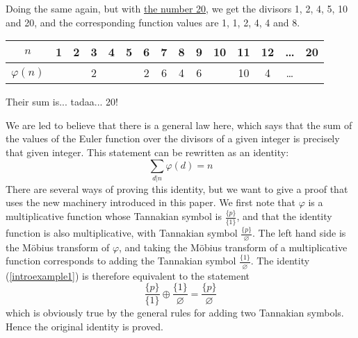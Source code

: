 \documentclass[a4paper]{article}
\begin{document}
\begin{example}
Doing the same again, but with \underline{the number 20}, we get the divisors 1, 2, 4, 5, 10 and 20, and the corresponding function values are 1, 1, 2, 4, 4 and 8. 

\vspace{6pt}
\begin{tabular}{  | c || c | c | c | c | c | c | c | c | c | c | c | c | c | c |  }
  \hline			
  $n$ & \bf{1} & \bf{2} & 3 & \bf{4} & \bf{5} & 6 & 7 & 8 & 9 & \bf{10} & 11 & 12 & \ldots & \bf{20}  \\
  \hline
  $\varphi(n) $ & \raisebox{.5pt}{\textcircled{\raisebox{-.9pt} {1}}} & \raisebox{.5pt}{\textcircled{\raisebox{-.9pt} {1}}} & 2 &  \raisebox{.5pt}{\textcircled{\raisebox{-.9pt} {2}}} &  \raisebox{.5pt}{\textcircled{\raisebox{-.9pt} {4}}} & 2 & 6 & 4 & 6 &  \raisebox{.5pt}{\textcircled{\raisebox{-.9pt} {4}}} & 10 & 4 & \ldots &  \raisebox{.5pt}{\textcircled{\raisebox{-.9pt} {8}}}  \\
  \hline  
\end{tabular}
\vspace{6pt}

Their sum is... tadaa... 20!

We are led to believe that there is a general law here, which says that the sum of the values of the Euler function over the divisors of a given integer is precisely that given integer. This statement can be rewritten as an identity:
\begin{equation} \label{introexample1}
\sum_{d \vert n} \varphi(d) = n  
\end{equation}
There are several ways of proving this identity, but we want to give a proof that uses the new machinery introduced in this paper. We first note that $\varphi$ is a multiplicative function whose Tannakian symbol is $\frac{ \{ p  \} }{ \{  1 \}  }$, and that the identity function is also multiplicative, with Tannakian symbol $\frac{ \{ p  \} }{ \varnothing  }$. The left hand side is the M{\"o}bius transform of $\varphi$, and taking the M{\"o}bius transform of a multiplicative function corresponds to adding the Tannakian symbol $\frac{ \{ 1  \} }{ \varnothing } $. The identity (\ref{introexample1}) is therefore equivalent to the statement 
\begin{equation}
\frac{ \{ p  \} }{ \{  1 \}  } \oplus \frac{ \{ 1  \} }{ \varnothing  } = \frac{ \{ p  \} }{ \varnothing  }
\end{equation}
which is obviously true by the general rules for adding two Tannakian symbols. Hence the original identity is proved.
\end{example}
\end{document}
